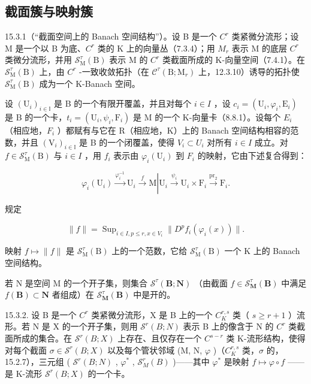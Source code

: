 \subsection{截面簇与映射簇}

15.3.1（“截面空间上的 Banach 空间结构”）。设 B 是一个 \(C^{r}\) 类紧微分流形；设 M 是一个以 B 为底、\(C^{r}\) 类的 K 上的向量丛（7.3.4）；用 \(M_{r}\) 表示 M 的底层 \(C^{r}\) 类微分流形，并用 \(\mathcal{S}_{\mathrm{M}}^{\tau}(\mathrm{B})\) 表示 M 的 \(C^{r}\) 类截面所成的 K-向量空间（7.4.1）。在 \(\mathcal{S}_{\mathrm{M}}^{\tau}(\mathrm{B})\) 上，由 \(C^{r}\) -一致收敛拓扑（在 \(\mathcal{C}^{\tau}(\mathrm{B};\mathrm{M}_{r})\) 上，12.3.10）诱导的拓扑使 \(\mathcal{S}_{\mathrm{M}}^{\tau}(\mathrm{B})\) 成为一个 K-Banach 空间。

设 \((\mathrm{U}_{i})_{i\in\mathbb{I}}\) 是 B 的一个有限开覆盖，并且对每个 \(i\in I\) ，设 \(c_{i}=(\mathrm{U}_{i},\varphi_{i},\mathrm{E}_{i})\) 是 B 的一个卡，\(t_{i}=(\mathrm{U}_{i},\psi_{i},\mathrm{F}_{i})\) 是 M 的一个 K-向量卡（8.8.1）。设每个 \(E_{i}\) （相应地，\(F_{i}\) ）都赋有与它在 R（相应地，K）上的 Banach 空间结构相容的范数，并且 \((\mathrm{V}_{i})_{i\in\mathbb{I}}\) 是 B 的一个闭覆盖，使得 \(V_{i}\subset U_{i}\) 对所有 \(i\in I\) 成立。对 \(f\in\mathcal{S}_{\mathrm{M}}^{\tau}(\mathrm{B})\) 与 \(i\in I\) ，用 \(f_{i}\) 表示由 \(\varphi_{i}(\mathrm{U}_{i})\) 到 \(F_{i}\) 的映射，它由下述复合得到：

\[
\varphi_ {i} \left(\mathrm{U} _ {i}\right) \xrightarrow {\varphi_ {i} ^ {- 1}} \mathrm{U} _ {i} \xrightarrow {f} \mathrm{M} \left| \mathrm{U} _ {i} \xrightarrow {\psi_ {i}} \mathrm{U} _ {i} \times \mathrm{F} _ {i} \xrightarrow {\operatorname{pr} _ {2}} \mathrm{F} _ {i}. \right.
\]

规定

\[
\| f \| = \operatorname{Sup} _ {i \in I, p \leqslant r, x \in V _ {i}} \| D ^ {p} f _ {i} (\varphi_ {i} (x)) \|.
\]

映射 \(f\mapsto\|f\|\) 是 \(\mathcal{S}_{\mathrm{M}}^{\tau}(\mathrm{B})\) 上的一个范数，它给 \(\mathcal{S}_{\mathrm{M}}^{\tau}(\mathrm{B})\) 一个 K 上的 Banach 空间结构。

若 N 是空间 M 的一个开子集，则集合 \(\mathcal{S}^{\tau}(\mathbf{B};\mathbf{N})\) （由截面 \(f\in\mathcal{S}_{\mathbf{M}}^{\tau}(\mathbf{B})\) 中满足 \(f(\mathbf{B})\subset\mathbf{N}\) 者组成）在 \(\mathcal{S}_{\mathbf{M}}^{\tau}(\mathbf{B})\) 中是开的。

15.3.2. 设 B 是一个 \(C^{r}\) 类紧微分流形，X 是 B 上的一个 \(C_{K}^{r,s}\) 类（ \(s \geqslant r + 1\) ）流形。若 N 是 X 的一个开子集，则用 \(\mathcal{S}^{r}(B; N)\) 表示 B 上的像含于 N 的 \(C^{r}\) 类截面所成的集合。在 \(\mathcal{S}^{r}(B; X)\) 上存在、且仅存在一个 \(C^{s-r}\) 类 K-流形结构，使得对每个截面 \(\sigma \in \mathcal{S}^{r}(B; X)\) 以及每个管状邻域 (M, N, \(\varphi\) )（\(C_{K}^{r,s}\) 类，\(\sigma\) 的，15.2.7），三元组 ( \(\mathcal{S}^{r}(B; N)\) , \(\varphi^{*}\) , \(\mathcal{S}_{M}^{r}(B)\) )——其中 \(\varphi^{*}\) 是映射 \(f \mapsto \varphi \circ f\) ——是 K-流形 \(\mathcal{S}^{r}(B; X)\) 的一个卡。

